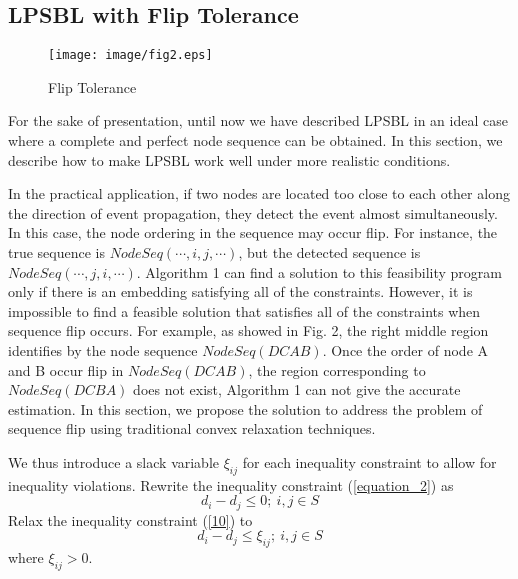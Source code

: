 \subsection{LPSBL with Flip Tolerance }

    \begin{figure}[!htb]
    \centering
 \setlength{\abovecaptionskip}{-15pt}
                     \vspace{-5mm}  
    \texttt{[image: image/fig2.eps]} 
	\vspace{10mm}
    \caption{Flip Tolerance}
	\label{fig2}
    \vspace{-5mm}
    \end{figure}

For the sake of presentation, until now we have described LPSBL in an ideal case where a complete and perfect node sequence can be obtained. 
In this section, we describe how to make LPSBL work well under more realistic conditions. 

In the practical application, if two nodes are located too close to each other along the direction of event propagation, they detect the event almost simultaneously. 
In this case, the node ordering in the sequence may occur flip. 
For instance, the true sequence is $NodeSeq ( \cdots ,i,j, \cdots )$, but the detected sequence is $NodeSeq ( \cdots ,j,i, \cdots )$.
Algorithm 1 can find a solution to this feasibility program only if there is an embedding satisfying all of the constraints. 
However, it is impossible to find a feasible solution that satisfies all of the constraints when sequence flip occurs. 
For example, as showed in Fig. 2, the right middle region identifies by the node sequence $NodeSeq (D C A B)$. 
Once the order of node A and B occur flip in $NodeSeq (D C A B)$, the region corresponding to $NodeSeq (D C B A)$ does not exist, Algorithm 1 can not give the accurate estimation.
In this section, we propose the solution to address the problem of sequence flip using traditional convex relaxation techniques.


We thus introduce a slack variable ${\xi _{ij}}$ for each inequality constraint to allow for inequality violations.
Rewrite the inequality constraint (\ref{equation_2}) as
 \begin{equation} \label{10}
 d_i - d_j  \le  0 ; \  i,j \in S
 \end{equation}
 Relax the inequality constraint (\ref{10}) to
 \begin{equation} \label{11}
 d_i - d_j  \le  \xi _{ij} ; \  i,j \in S
 \end{equation}
 where
 \begin{math}
 \xi _{ij}  > 0
 \end{math}.
 

